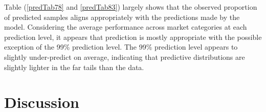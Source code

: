 \documentclass[12pt]{article}
\begin{document}
Table (\ref{predTab78} and \ref{predTab83}) largely shows that the observed 
proportion of predicted samples aligns appropriately with the predictions made 
by the model. Considering the average performance across market categories 
at each prediction level, it appears that prediction is mostly appropriate 
with the possible exception of the 99\% prediction level. The 99\% prediction 
level appears to slightly under-predict on average, indicating that predictive 
distributions are slightly lighter in the far tails than the data.

%
%
\section{Discussion}\label{discussion}
%
%

%
%
%


\end{document}
